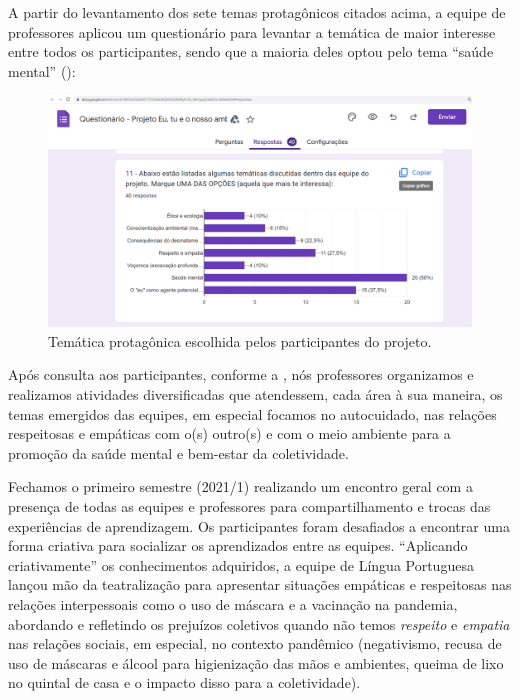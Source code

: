 A partir do levantamento dos sete temas protagônicos citados acima, a equipe de professores aplicou um questionário para levantar a temática de maior interesse entre todos os participantes, sendo que a maioria deles optou pelo tema “saúde mental” ():

\begin{figure}[htbp]
\centering
\begin{minipage}{.9\textwidth}
\includegraphics[width=\textwidth]{figure02.png}
\caption{Temática protagônica escolhida pelos participantes do projeto.}\label{fig-02}
\end{minipage}
\end{figure}
  
Após consulta aos participantes, conforme a , nós professores organizamos e realizamos atividades diversificadas que atendessem, cada área à sua maneira, os temas emergidos das equipes, em especial focamos no autocuidado, nas relações respeitosas e empáticas com o(s) outro(s) e com o meio ambiente para a promoção da saúde mental e bem-estar da coletividade.

Fechamos o primeiro semestre (2021/1) realizando um encontro geral com a presença de todas as equipes e professores para compartilhamento e trocas das experiências de aprendizagem. Os participantes foram desafiados a encontrar uma forma criativa para socializar os aprendizados entre as equipes. “Aplicando criativamente” os conhecimentos adquiridos, a equipe de Língua Portuguesa lançou mão da teatralização para apresentar situações empáticas e respeitosas nas relações interpessoais como o uso de máscara e a vacinação na pandemia, abordando e refletindo os prejuízos coletivos quando não temos \textit{respeito} e \textit{empatia} nas relações sociais, em especial, no contexto pandêmico (negativismo, recusa de uso de máscaras e álcool para higienização das mãos e ambientes, queima de lixo no quintal de casa e o impacto disso para a coletividade).

